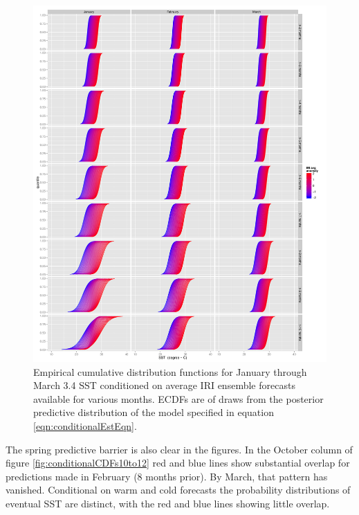 \documentclass[article]{jss}
\begin{document}
\begin{figure}[!htbp]
  \begin{center}
    \includegraphics[width=\linewidth, keepaspectratio]{img/conditionalCDFs01to03TraditionalCDFconfig.pdf}
    \caption{Empirical cumulative distribution functions for January through March  3.4 SST conditioned on average IRI ensemble forecasts available for various months. ECDFs are of draws from the posterior predictive distribution of the model specified in equation \ref{eqn:conditionalEstEqn}.}
    \label{fig:conditionalCDFs01to03}
   \end{center}
\end{figure}

The spring predictive barrier is also clear in the figures. In the
October column of figure \ref{fig:conditionalCDFs10to12} red and blue
lines show substantial overlap for predictions made in February (8
months prior). By March, that pattern has vanished. Conditional on warm
and cold forecasts the probability distributions of eventual SST are
distinct, with the red and blue lines showing little overlap.
\end{document}
